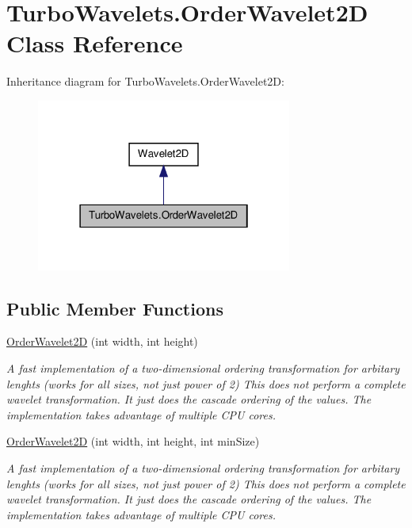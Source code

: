\hypertarget{class_turbo_wavelets_1_1_order_wavelet2_d}{\section{\-Turbo\-Wavelets.\-Order\-Wavelet2\-D \-Class \-Reference}
\label{class_turbo_wavelets_1_1_order_wavelet2_d}
}


\-Inheritance diagram for \-Turbo\-Wavelets.\-Order\-Wavelet2\-D\-:
\nopagebreak
\begin{figure}[H]
\begin{center}
\leavevmode
\includegraphics[width=238pt]{class_turbo_wavelets_1_1_order_wavelet2_d__inherit__graph}
\end{center}
\end{figure}
\subsection*{\-Public \-Member \-Functions}
\begin{DoxyCompactItemize}
\item 
\hyperlink{class_turbo_wavelets_1_1_order_wavelet2_d_aed357d3d66affbf094ee6e104ac75f1f}{\-Order\-Wavelet2\-D} (int width, int height)
\begin{DoxyCompactList}\small\item\em \-A fast implementation of a two-\/dimensional ordering transformation for arbitary lenghts (works for all sizes, not just power of 2) \-This does not perform a complete wavelet transformation. \-It just does the cascade ordering of the values. \-The implementation takes advantage of multiple \-C\-P\-U cores. \end{DoxyCompactList}\item 
\hyperlink{class_turbo_wavelets_1_1_order_wavelet2_d_a22aec9d1c8fd7f56ac480a305ce4e9cd}{\-Order\-Wavelet2\-D} (int width, int height, int min\-Size)
\begin{DoxyCompactList}\small\item\em \-A fast implementation of a two-\/dimensional ordering transformation for arbitary lenghts (works for all sizes, not just power of 2) \-This does not perform a complete wavelet transformation. \-It just does the cascade ordering of the values. \-The implementation takes advantage of multiple \-C\-P\-U cores. \end{DoxyCompactList}\end{DoxyCompactItemize}


